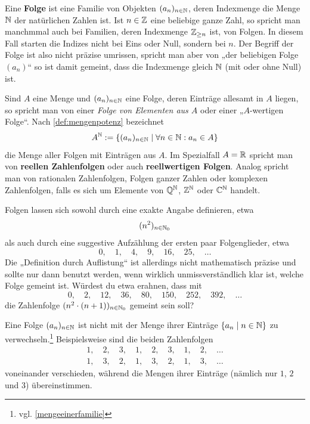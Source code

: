 \begin{de}[Folge] \label{def:folge} 
    Eine \textbf{Folge} ist eine Familie von Objekten $(a_n)_{n\in \mathbb N}$, deren Indexmenge die Menge $\mathbb N$ der natürlichen Zahlen ist. Ist $n\in \mathbb Z$ eine beliebige ganze Zahl, so spricht man manchmmal auch bei Familien, deren Indexmenge $\mathbb Z_{\ge n}$ ist, von Folgen. In diesem Fall starten die Indizes nicht bei Eins oder Null, sondern bei $n$. Der Begriff der Folge ist also nicht präzise umrissen, spricht man aber von „der beliebigen Folge $(a_n)$“ so ist damit gemeint, dass die Indexmenge gleich $\mathbb N$ (mit oder ohne Null) ist.
    
    Sind $A$ eine Menge und $(a_n)_{n\in \mathbb N}$ eine Folge, deren Einträge allesamt in $A$ liegen, so spricht man von einer \emph{Folge von Elementen aus $A$} oder einer „$A$-wertigen Folge“. Nach \cref{def:mengenpotenz} bezeichnet
    \[ A^\mathbb N := \{ (a_n)_{n\in \mathbb N} \mid \forall n\in \mathbb N: a_n\in A \} \]
    die Menge aller Folgen mit Einträgen aus $A$. Im Spezialfall $A=\mathbb R$ spricht man von \textbf{reellen Zahlenfolgen} oder auch \textbf{reellwertigen Folgen}. Analog spricht man von rationalen Zahlenfolgen, Folgen ganzer Zahlen oder komplexen Zahlenfolgen, falls es sich um Elemente von $\mathbb Q^\mathbb N$, $\mathbb Z^\mathbb N$ oder $\mathbb C^\mathbb N$ handelt.
\end{de}


\begin{nota}
    Folgen lassen sich sowohl durch eine exakte Angabe definieren, etwa
    \begin{align*}
        (n^2)_{n\in \mathbb N_0}
    \end{align*}
    als auch durch eine suggestive Aufzählung der ersten paar Folgenglieder, etwa
        \[ 0,\quad 1,\quad 4,\quad 9,\quad 16,\quad 25,\quad\dots \]
    Die „Definition durch Auflistung“ ist allerdings nicht mathematisch präzise und sollte nur dann benutzt werden, wenn wirklich unmissverständlich klar ist, welche Folge gemeint ist. Würdest du etwa erahnen, dass mit
        \[ 0,\quad 2,\quad 12,\quad 36,\quad 80,\quad 150,\quad 252,\quad 392,\quad \dots\]
    die Zahlenfolge $(n^2\cdot (n+1))_{n\in \mathbb N_0}$ gemeint sein soll?
\end{nota}


\begin{bem}
    Eine Folge $(a_n)_{n\in \mathbb N}$ ist nicht mit der Menge ihrer Einträge $\{a_n\mid n\in \mathbb N\}$ zu verwechseln.\footnote{vgl. \cref{mengeeinerfamilie}} Beispielsweise sind die beiden Zahlenfolgen
    \begin{align*}
        1,\quad 2,\quad 3,\quad 1,\quad 2,\quad 3,\quad 1,\quad 2,\quad \dots \\
        1,\quad 3,\quad 2,\quad 1,\quad 3,\quad 2,\quad 1,\quad 3,\quad \dots
    \end{align*}
    voneinander verschieden, während die Mengen ihrer Einträge (nämlich nur $1$, $2$ und $3$) übereinstimmen.
\end{bem}


